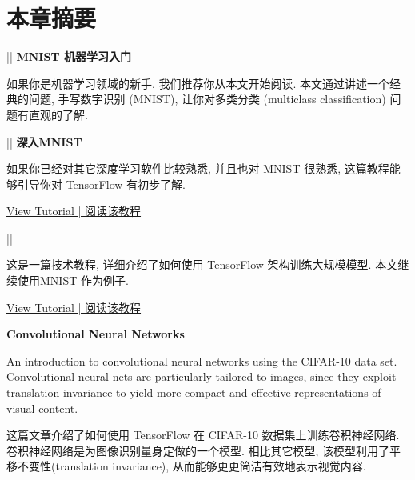


\section*{本章摘要}

\hyperref[MINIST_beginner]{   ||  \textbf{MNIST 机器学习入门}}


如果你是机器学习领域的新手, 我们推荐你从本文开始阅读. 本文通过讲述一个经典的问题, 手写数字识别 (MNIST), 让你对多类分类 (multiclass classification) 问题有直观的了解.

   ||  \textbf{深入MNIST}


如果你已经对其它深度学习软件比较熟悉, 并且也对 MNIST 很熟悉, 这篇教程能够引导你对 TensorFlow 有初步了解.

\hyperref[MINIST_pros]{View Tutorial | 阅读该教程}

   ||  \textbf{}


这是一篇技术教程, 详细介绍了如何使用 TensorFlow 架构训练大规模模型. 本文继续使用MNIST 作为例子.

\hyperref[tf_mech101]{View Tutorial | 阅读该教程}

\textbf{Convolutional Neural Networks}

An introduction to convolutional neural networks using the CIFAR-10 data set. Convolutional neural nets are particularly tailored to images, since they exploit translation invariance to yield more compact and effective representations of visual content.

这篇文章介绍了如何使用 TensorFlow 在 CIFAR-10 数据集上训练卷积神经网络. 卷积神经网络是为图像识别量身定做的一个模型. 相比其它模型, 该模型利用了平移不变性(translation invariance), 从而能够更更简洁有效地表示视觉内容.

